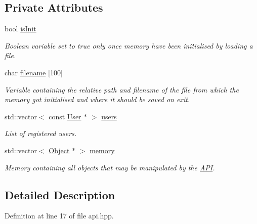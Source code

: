 \subsection*{Private Attributes}
\begin{DoxyCompactItemize}
\item 
bool \hyperlink{classAPI_a197a1a46641b76e5eb42daec3667d13e}{is\+Init}
\begin{DoxyCompactList}\small\item\em Boolean variable set to true only once memory have been initialised by loading a file. \end{DoxyCompactList}\item 
char \hyperlink{classAPI_aa4e36aeea94c8fae7fe0b2a2db58d06b}{filename} \mbox{[}100\mbox{]}
\begin{DoxyCompactList}\small\item\em Variable containing the relative path and filename of the file from which the memory got initialised and where it should be saved on exit. \end{DoxyCompactList}\item 
\hypertarget{classAPI_a139c766a1994eceebb8107246e84e6ce}{}std\+::vector$<$ const \hyperlink{classUser}{User} $\ast$ $>$ \hyperlink{classAPI_a139c766a1994eceebb8107246e84e6ce}{users}\label{classAPI_a139c766a1994eceebb8107246e84e6ce}

\begin{DoxyCompactList}\small\item\em List of registered users. \end{DoxyCompactList}\item 
\hypertarget{classAPI_a7ab6c1e81a7ef53b251271e345f81bec}{}std\+::vector$<$ \hyperlink{classObject}{Object} $\ast$ $>$ \hyperlink{classAPI_a7ab6c1e81a7ef53b251271e345f81bec}{memory}\label{classAPI_a7ab6c1e81a7ef53b251271e345f81bec}

\begin{DoxyCompactList}\small\item\em Memory containing all objects that may be manipulated by the \hyperlink{classAPI}{A\+P\+I}. \end{DoxyCompactList}\end{DoxyCompactItemize}


\subsection{Detailed Description}


Definition at line 17 of file api.\+hpp.



